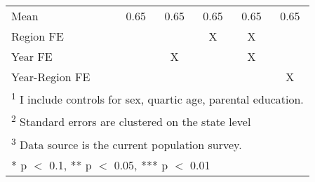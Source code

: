 \begin{table}[!h]
{\begin{tabular}[t]{lccccc}
Mean & \num{0.65} & \num{0.65} & \num{0.65} & \num{0.65} & \num{0.65}\\
Region FE &  &  & X & X & \\
Year FE &  & X &  & X & \\
Year-Region FE &  &  &  &  & X\\
\bottomrule
\multicolumn{6}{l}{\rule{0pt}{1em}\textsuperscript{1} I include controls for sex, quartic age, parental education.}\\
\multicolumn{6}{l}{\rule{0pt}{1em}\textsuperscript{2} Standard errors are clustered on the state level}\\
\multicolumn{6}{l}{\rule{0pt}{1em}\textsuperscript{3} Data source is the current population survey.}\\
\multicolumn{6}{l}{\rule{0pt}{1em}* p $<$ 0.1, ** p $<$ 0.05, *** p $<$ 0.01}\\
\end{tabular}}
\end{table}
